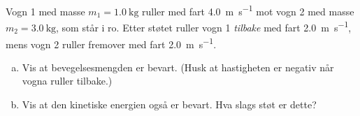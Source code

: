 %
Vogn 1 med masse $m_1 = \SI{1.0}{\kilo\gram}$ ruller med fart \SI{4.0}{\metre\per\second} mot vogn 2 med masse $m_2 = \SI{3.0}{\kilo\gram}$, som står i ro. Etter støtet ruller vogn 1 \emph{tilbake} med fart \SI{2.0}{\metre\per\second}, mens vogn 2 ruller fremover med fart \SI{2.0}{\metre\per\second}.
\begin{enumerate}[a)]
    \item Vis at bevegelsesmengden er bevart. (Husk at hastigheten er negativ når vogna ruller tilbake.)
    \item Vis at den kinetiske energien også er bevart. Hva slags støt er dette?
\end{enumerate}
